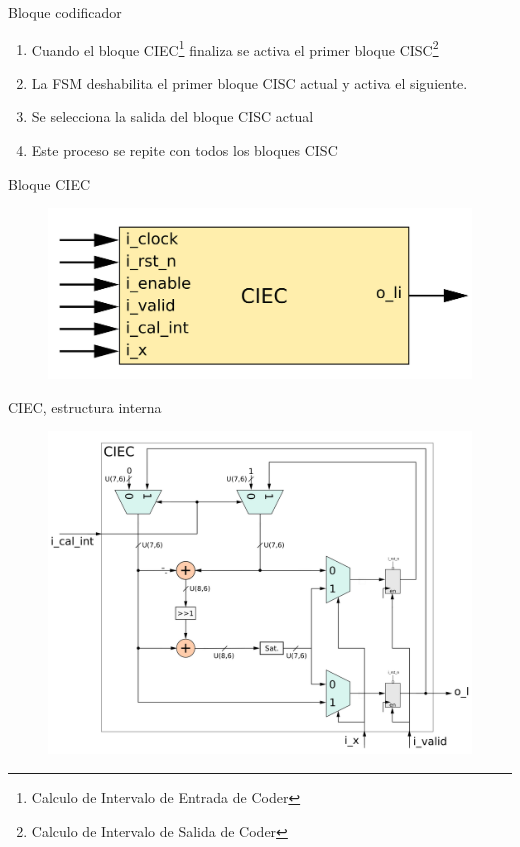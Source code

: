 \documentclass[xcolor=table]{beamer}
\begin{document}
\begin{frame}{Bloque codificador}
\begin{enumerate}
    \item Cuando el bloque CIEC\footnote{Calculo de Intervalo de Entrada de Coder} finaliza se activa el primer bloque CISC\footnote{Calculo de Intervalo de Salida de Coder} 
    \item  La FSM deshabilita el primer bloque CISC actual y activa el siguiente.
    \item Se selecciona la salida del bloque CISC actual
    \item Este proceso se repite con todos los bloques CISC
\end{enumerate}
\end{frame}


\begin{frame}{Bloque CIEC}
 \begin{figure}
  \centering
  \includegraphics[width=0.70\paperwidth]{Diagramas/ciec.png}%
\end{figure}
\end{frame}

\begin{frame}{CIEC, estructura interna}

 \begin{figure}
  \centering
  \includegraphics[width=0.70\paperwidth]{Diagramas/internal_ciec.png}%
\end{figure}
\end{frame}
\end{document}
